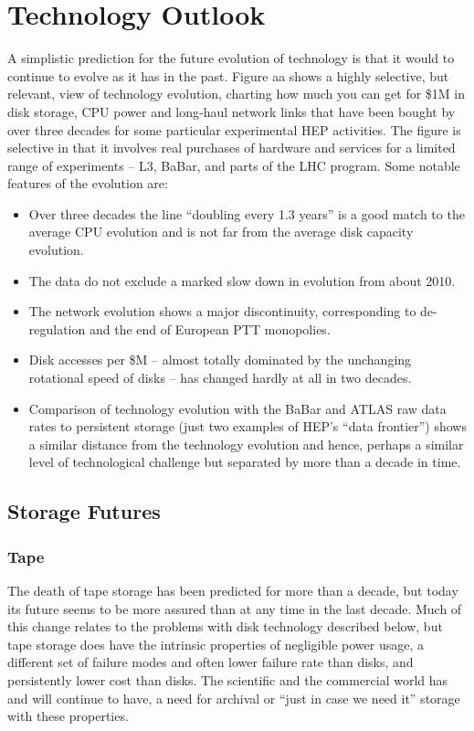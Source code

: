 \section{Technology Outlook}
\label{sec:cpfi5-technology}
A simplistic prediction for the future evolution of technology is that it 
would to continue to 
evolve as it has in the past.  Figure aa shows a highly selective, but relevant, 
view of technology evolution, charting how much you can get for \$1M in disk storage, 
CPU power and long-haul network links that have been bought by over three decades 
for some particular experimental HEP activities.  The figure is  selective in that 
it involves real purchases of hardware and services for a limited range of 
experiments -- L3, BaBar, and parts of the LHC program. Some notable features of the 
evolution are:
\begin{itemize}
\item
Over three decades the line ``doubling every 1.3 years'' is a good match to the average 
CPU evolution and is not far from the average disk capacity evolution.
\item
The data do not exclude a marked slow down in evolution from about 2010.
\item
The network evolution shows a major discontinuity, corresponding to de-regulation 
and the end of European PTT monopolies.
\item
Disk accesses per \$M -- almost totally dominated by the unchanging rotational 
speed of disks -- has changed hardly at all in two decades.
\item
Comparison of technology evolution with the BaBar and ATLAS raw data rates to 
persistent storage (just two examples of HEP’s ``data frontier'') shows a similar 
distance from the technology evolution and hence, perhaps a similar level of 
technological challenge but separated by more than a decade in time. 
\end{itemize}

\subsection{Storage Futures}
\subsubsection{Tape}
The death of tape storage has been predicted for more than a decade, but today 
its future seems to be more assured than at any time in the last decade.  
Much of this change relates to the problems with disk technology described 
below, but tape storage does have the intrinsic properties of negligible 
power usage, a different set of failure modes and often lower failure rate 
than disks, and persistently lower cost than disks.  The scientific and the 
commercial world has and will continue to have, a need for archival or ``just 
in case we need it'' storage with these properties.

